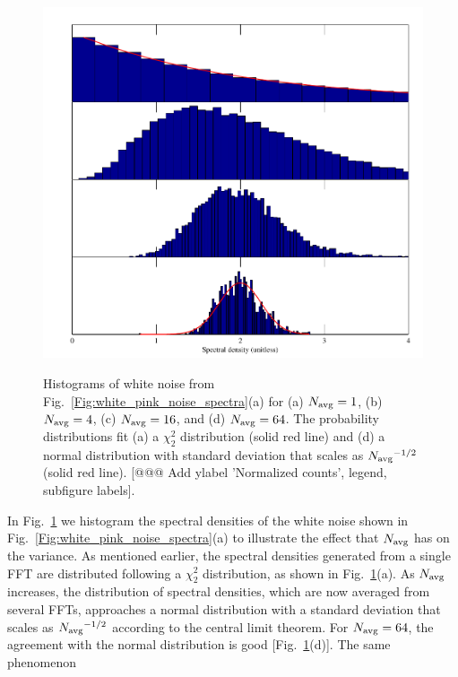 \begin{figure}
\centering\includegraphics{stitch_spec/noise_histograms}\\
\caption[Histograms of white noise]{Histograms of white noise from Fig.~\ref{Fig:white_pink_noise_spectra}(a) for (a) $N_\text{avg}{} = 1$, (b) $N_\text{avg}{} = 4$, (c) $N_\text{avg}{} = 16$, and (d) $N_\text{avg}{} = 64$. The probability distributions fit (a) a $\chi_2^2$ distribution (solid red line) and (d) a normal distribution with standard deviation that scales as $N_\text{avg}{}^{-1/2}$ (solid red line). [@@@ Add ylabel 'Normalized counts', legend, subfigure labels].}
\label{Fig:noise_histograms}
\end{figure}

In Fig.~\ref{Fig:noise_histograms} we histogram the spectral densities of the white noise shown in Fig.~\ref{Fig:white_pink_noise_spectra}(a) to illustrate the effect that $N_\text{avg}{}$ has on the variance. As mentioned earlier, the spectral densities generated from a single FFT are distributed following a $\chi_2^2$ distribution, as shown in Fig.~\ref{Fig:noise_histograms}(a). As $N_\text{avg}{}$ increases, the distribution of spectral densities, which are now averaged from several FFTs, approaches a normal distribution with a standard deviation that scales as $N_\text{avg}{}^{-1/2}$ according to the central limit theorem. For $N_\text{avg}{} = 64$, the agreement with the normal distribution is good [Fig.~\ref{Fig:noise_histograms}(d)]. The same phenomenon 